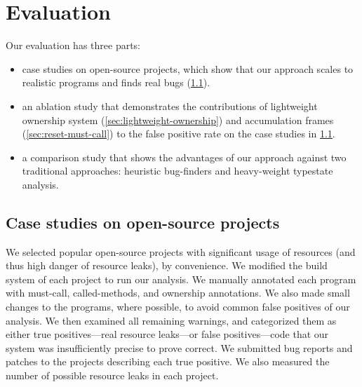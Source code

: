 \section{Evaluation}

Our evaluation has three parts:
\begin{itemize}
\item case studies on open-source projects, which show that our approach
  scales to realistic programs and finds real bugs (\cref{sec:case-studies}).
\item an ablation study that demonstrates the contributions of
  lightweight ownership system (\cref{sec:lightweight-ownership}) and
  accumulation frames (\cref{sec:reset-must-call}) to the false positive
  rate on the case studies in \cref{sec:case-studies}.
\item a comparison study that shows the advantages of our approach against
  two traditional approaches: heuristic bug-finders and heavy-weight
  typestate analysis.
\end{itemize}

\subsection{Case studies on open-source projects}
\label{sec:case-studies}

We selected  popular open-source projects with significant
usage of resources (and thus high danger of resource leaks), by
convenience.  We modified the build system of each project to run our
analysis. We manually annotated each program with must-call,
called-methods, and ownership annotations. We also
made small changes to the programs, where possible, to avoid
common false positives of our analysis. We then examined all
remaining warnings, and categorized them as either true
positives---real resource leaks---or false positives---code that our
system was insufficiently precise to prove correct. We submitted bug
reports and patches to the projects describing each true positive.
We also measured the number of possible resource leaks in each project.

\newcommand{\osstablerow}[8]{\textbf{\smaller{#1}} & #2 & #3 & #4 & #5 & #6 & #7 & #8}

